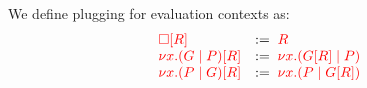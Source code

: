 \begin{definition}[Plugging]\label{def:cp-evaluation-contexts-plugging}
  We define plugging for evaluation contexts as:
  \begin{gather*}
    \begin{array}{ll}
      \textcolor{red}{{\Box}[{R}]}            
      & := \; \textcolor{red}{R}
      \\
      \textcolor{red}{{\nu x.(G \mid P)}[{R}]}
      & := \; \textcolor{red}{\nu x.({G}[{R}] \mid P)}
      \\
      \textcolor{red}{{\nu x.(P \mid G)}[{R}]}
      & := \; \textcolor{red}{\nu x.(P \mid {G}[{R}])}
    \end{array}
  \end{gather*}
\end{definition}
